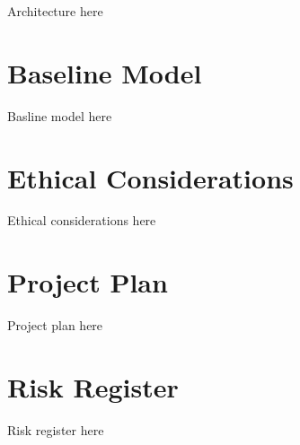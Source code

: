 \documentclass{article} %
\begin{document}
Architecture here

\section{Baseline Model}
\label{baseline}

Basline model here

\section{Ethical Considerations}
\label{ethical}

Ethical considerations here

\section{Project Plan}
\label{plan}

Project plan here

\section{Risk Register}
\label{risk}

Risk register here

\label{last_page}



\end{document}
